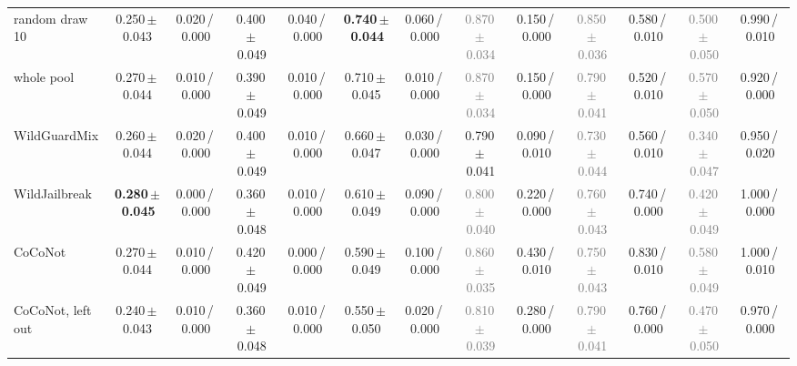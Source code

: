 \begin{tabular}{@{}lcccccccccccc@{}}
random draw 10 & 0.250\,{\scriptsize$\pm$\,0.043} & {\scriptsize 0.020\,/\,0.000} & 0.400\,{\scriptsize$\pm$\,0.049} & {\scriptsize 0.040\,/\,0.000} & \textbf{0.740\,{\scriptsize$\pm$\,0.044}} & {\scriptsize 0.060\,/\,0.000} & \textcolor{gray}{0.870\,{\scriptsize$\pm$\,0.034}} & {\scriptsize 0.150\,/\,0.000} & \textcolor{gray}{0.850\,{\scriptsize$\pm$\,0.036}} & {\scriptsize 0.580\,/\,0.010} & \textcolor{gray}{0.500\,{\scriptsize$\pm$\,0.050}} & {\scriptsize 0.990\,/\,0.010} \\
whole pool & 0.270\,{\scriptsize$\pm$\,0.044} & {\scriptsize 0.010\,/\,0.000} & 0.390\,{\scriptsize$\pm$\,0.049} & {\scriptsize 0.010\,/\,0.000} & 0.710\,{\scriptsize$\pm$\,0.045} & {\scriptsize 0.010\,/\,0.000} & \textcolor{gray}{0.870\,{\scriptsize$\pm$\,0.034}} & {\scriptsize 0.150\,/\,0.000} & \textcolor{gray}{0.790\,{\scriptsize$\pm$\,0.041}} & {\scriptsize 0.520\,/\,0.010} & \textcolor{gray}{0.570\,{\scriptsize$\pm$\,0.050}} & {\scriptsize 0.920\,/\,0.000} \\
WildGuardMix & 0.260\,{\scriptsize$\pm$\,0.044} & {\scriptsize 0.020\,/\,0.000} & 0.400\,{\scriptsize$\pm$\,0.049} & {\scriptsize 0.010\,/\,0.000} & 0.660\,{\scriptsize$\pm$\,0.047} & {\scriptsize 0.030\,/\,0.000} & 0.790\,{\scriptsize$\pm$\,0.041} & {\scriptsize 0.090\,/\,0.010} & \textcolor{gray}{0.730\,{\scriptsize$\pm$\,0.044}} & {\scriptsize 0.560\,/\,0.010} & \textcolor{gray}{0.340\,{\scriptsize$\pm$\,0.047}} & {\scriptsize 0.950\,/\,0.020} \\
WildJailbreak & \textbf{0.280\,{\scriptsize$\pm$\,0.045}} & {\scriptsize 0.000\,/\,0.000} & 0.360\,{\scriptsize$\pm$\,0.048} & {\scriptsize 0.010\,/\,0.000} & 0.610\,{\scriptsize$\pm$\,0.049} & {\scriptsize 0.090\,/\,0.000} & \textcolor{gray}{0.800\,{\scriptsize$\pm$\,0.040}} & {\scriptsize 0.220\,/\,0.000} & \textcolor{gray}{0.760\,{\scriptsize$\pm$\,0.043}} & {\scriptsize 0.740\,/\,0.000} & \textcolor{gray}{0.420\,{\scriptsize$\pm$\,0.049}} & {\scriptsize 1.000\,/\,0.000} \\
CoCoNot & 0.270\,{\scriptsize$\pm$\,0.044} & {\scriptsize 0.010\,/\,0.000} & 0.420\,{\scriptsize$\pm$\,0.049} & {\scriptsize 0.000\,/\,0.000} & 0.590\,{\scriptsize$\pm$\,0.049} & {\scriptsize 0.100\,/\,0.000} & \textcolor{gray}{0.860\,{\scriptsize$\pm$\,0.035}} & {\scriptsize 0.430\,/\,0.010} & \textcolor{gray}{0.750\,{\scriptsize$\pm$\,0.043}} & {\scriptsize 0.830\,/\,0.010} & \textcolor{gray}{0.580\,{\scriptsize$\pm$\,0.049}} & {\scriptsize 1.000\,/\,0.010} \\
CoCoNot, left out & 0.240\,{\scriptsize$\pm$\,0.043} & {\scriptsize 0.010\,/\,0.000} & 0.360\,{\scriptsize$\pm$\,0.048} & {\scriptsize 0.010\,/\,0.000} & 0.550\,{\scriptsize$\pm$\,0.050} & {\scriptsize 0.020\,/\,0.000} & \textcolor{gray}{0.810\,{\scriptsize$\pm$\,0.039}} & {\scriptsize 0.280\,/\,0.000} & \textcolor{gray}{0.790\,{\scriptsize$\pm$\,0.041}} & {\scriptsize 0.760\,/\,0.000} & \textcolor{gray}{0.470\,{\scriptsize$\pm$\,0.050}} & {\scriptsize 0.970\,/\,0.000} \\

\end{tabular}
